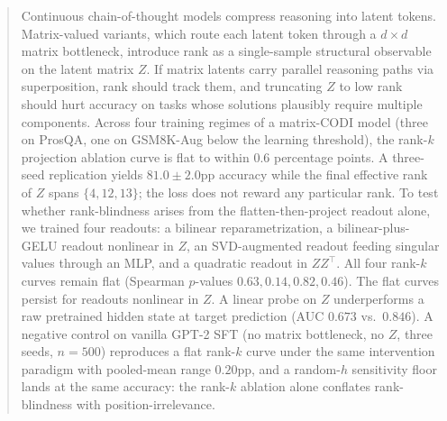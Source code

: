 \documentclass{article}
\theoremstyle{plain}
\theoremstyle{definition}
\newcommand{\Z}{Z}
\begin{document}

\printAffiliationsAndNotice{}  %

\begin{abstract}
Continuous chain-of-thought models compress reasoning into latent
tokens. Matrix-valued variants, which route each latent token through a
$d\times d$ matrix bottleneck, introduce rank as a single-sample
structural observable on the latent matrix $\Z$. If matrix latents
carry parallel reasoning paths via superposition, rank should track
them, and truncating $\Z$ to low rank should hurt accuracy on tasks
whose solutions plausibly require multiple components. Across four
training regimes of a matrix-CODI model (three on ProsQA, one on
GSM8K-Aug below the learning threshold), the rank-$k$ projection
ablation curve is flat to within 0.6 percentage points. A three-seed
replication yields $81.0 \pm 2.0$pp accuracy while the final
effective rank of $\Z$ spans $\{4, 12, 13\}$; the loss does not
reward any particular rank. To test whether rank-blindness arises
from the flatten-then-project readout alone, we trained four
readouts: a bilinear reparametrization, a bilinear-plus-GELU readout
nonlinear in $\Z$, an SVD-augmented readout feeding singular values
through an MLP, and a quadratic readout in $\Z\Z^\top$. All four
rank-$k$ curves remain flat (Spearman $p$-values $0.63, 0.14, 0.82,
0.46$). The flat curves persist for readouts nonlinear in $\Z$. A
linear probe on $\Z$ underperforms a raw pretrained hidden state
at target prediction (AUC $0.673$ vs.\ $0.846$). A negative control
on vanilla GPT-2 SFT (no matrix bottleneck, no $\Z$, three seeds,
$n\!=\!500$) reproduces a flat rank-$k$ curve under the same
intervention paradigm with pooled-mean range $0.20$pp, and a
random-$h$ sensitivity floor lands at the same accuracy: the
rank-$k$ ablation alone conflates rank-blindness with
position-irrelevance.
\end{abstract}














\end{document}
